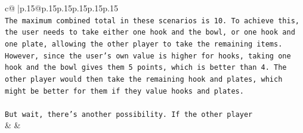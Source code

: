 \documentclass{article}
\begin{document}
{\begin{supertabular}{c@{$\;$}|p{.15\linewidth}@{}p{.15\linewidth}p{.15\linewidth}p{.15\linewidth}p{.15\linewidth}p{.15\linewidth}}
{{{\\ 
\texttt{The maximum combined total in these scenarios is 10. To achieve this, the user needs to take either one hook and the bowl, or one hook and one plate, allowing the other player to take the remaining items. However, since the user's own value is higher for hooks, taking one hook and the bowl gives them 5 points, which is better than 4. The other player would then take the remaining hook and plates, which might be better for them if they value hooks and plates.} \\
\\ 
\texttt{But wait, there's another possibility. If the other player} \\
            }
        }
    }
    & & \\ \\


\end{supertabular}}
\end{document}

